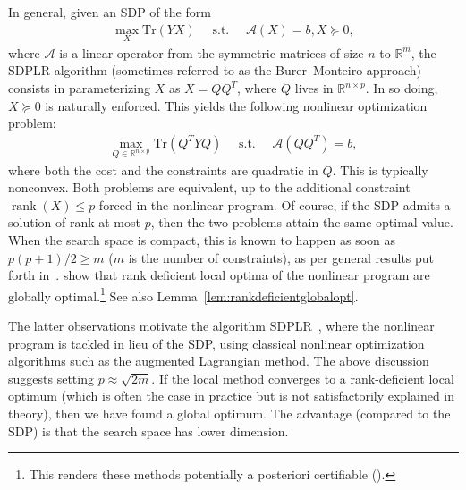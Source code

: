 \documentclass{colt2016} %
\newcommand{\Trace}{\mathrm{Tr}}
\newcommand{\Rnp}{{\mathbb{R}^{n\times p}}}
\newcommand{\Rm}{{\mathbb{R}^m}}
\newcommand{\calA}{\mathcal{A}}
\newcommand{\rank}{\operatorname{rank}}
\newcommand{\1}{\mathbf{1}}
\newcommand{\TODO}[1]{{\color{red}{[#1]}}}
\begin{document}
In general, given an SDP of the form
\begin{align}
	\max_{X} \Trace(YX) \quad \textrm{ s.t. } \quad \calA(X) = b, X \succeq 0,
\end{align}
where $\calA$ is a linear operator from the symmetric matrices of size $n$ to $\Rm$,
the SDPLR algorithm (sometimes referred to as the Burer--Monteiro approach) consists in parameterizing $X$ as $X = QQ^T$, where $Q$ lives in $\Rnp$. In so doing, $X \succeq 0$ is naturally enforced. This yields the following nonlinear optimization problem:
\begin{align}
\max_{Q\in\Rnp} \Trace(Q^TYQ) \quad \textrm{ s.t. } \quad \calA(QQ^T) = b,
\end{align}
where both the cost and the constraints are quadratic in $Q$. This is typically nonconvex. Both problems are equivalent, up to the additional constraint $\rank(X) \leq p$ forced in the nonlinear program. Of course, if the SDP admits a solution of rank at most $p$, then the two problems attain the same optimal value. When the search space is compact, this is known to happen as soon as $p(p+1)/2 \geq m$ ($m$ is the number of constraints), as per general results put forth in~\citep{shapiro1982rank,barvinok1995problems,pataki1998rank}. \cite{burer2005local} show that rank deficient local optima of the nonlinear program are globally optimal.\footnote{This renders these methods potentially a posteriori certifiable (\cite{Bandeira_PCC}).} See also Lemma~\ref{lem:rankdeficientglobalopt}.

The latter observations motivate the algorithm SDPLR~\citep{sdplr}, where the nonlinear program is tackled in lieu of the SDP, using classical nonlinear optimization algorithms such as the augmented Lagrangian method. The above discussion suggests setting $p \approx \sqrt{2m}$. If the local method converges to a rank-deficient local optimum (which is often the case in practice but is not satisfactorily explained in theory), then we have found a global optimum. The advantage (compared to the SDP) is that the search space has lower dimension.

\end{document}
